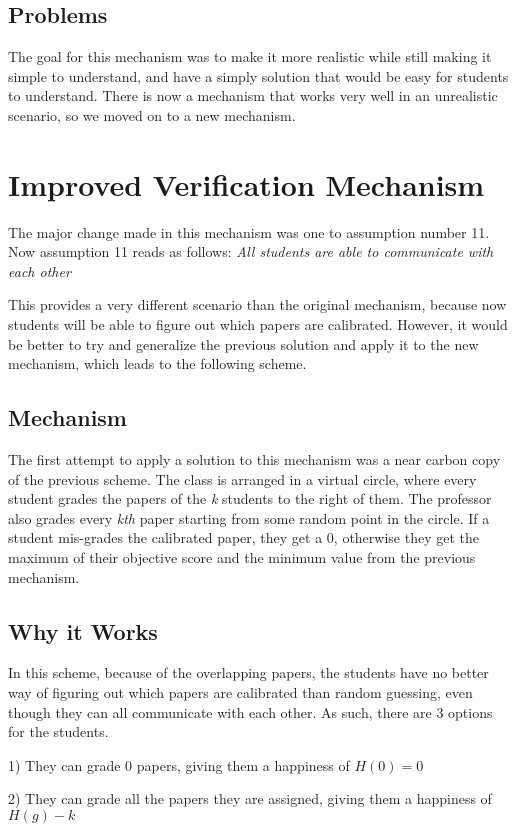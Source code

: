 \documentclass[12pt, Arial]{article}
\begin{document}
\subsection{Problems}
The goal for this mechanism was to make it more realistic while still making it simple to understand, and have a simply solution that would be easy for students to understand. There is now a mechanism that works very well in an unrealistic scenario, so we moved on to a new mechanism. 

\section{Improved Verification Mechanism}
The major change made in this mechanism was one to assumption number 11. Now assumption 11 reads as follows:
\emph{All students are able to communicate with each other}

This provides a very different scenario than the original mechanism, because now students will be able to figure out which papers are calibrated. However, it would be better to try and generalize the previous solution and apply it to the new mechanism, which leads to the following scheme.

\subsection{Mechanism}
The first attempt to apply a solution to this mechanism was a near carbon copy of the previous scheme.
The class is arranged in a virtual circle, where every student grades the papers of the \emph{k} students to the right of them. The professor also grades every \emph{kth} paper starting from some random point in the circle. If a student mis-grades the calibrated paper, they get a 0, otherwise they get the maximum of their objective score and the minimum value from the previous mechanism.

\subsection{Why it Works}
In this scheme, because of the overlapping papers, the students have no better way of figuring out which papers are calibrated than random guessing, even though they can all communicate with each other. As such, there are 3 options for the students.

1) They can grade 0 papers, giving them a happiness of $H(0) = 0$

2) They can grade all the papers they are assigned, giving them a happiness of $H(g) - k$
\end{document}

